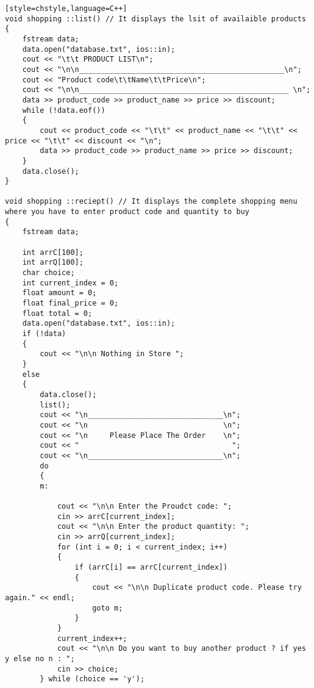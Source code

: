 \documentclass{article}
\begin{document}
\begin{verbatim}[style=chstyle,language=C++]
void shopping ::list() // It displays the lsit of availaible products
{
    fstream data;
    data.open("database.txt", ios::in);
    cout << "\t\t PRODUCT LIST\n";
    cout << "\n\n_______________________________________________\n";
    cout << "Product code\t\tName\t\tPrice\n";
    cout << "\n\n________________________________________________ \n";
    data >> product_code >> product_name >> price >> discount;
    while (!data.eof())
    {
        cout << product_code << "\t\t" << product_name << "\t\t" << price << "\t\t" << discount << "\n";
        data >> product_code >> product_name >> price >> discount;
    }
    data.close();
}

void shopping ::reciept() // It displays the complete shopping menu where you have to enter product code and quantity to buy
{
    fstream data;

    int arrC[100];
    int arrQ[100];
    char choice;
    int current_index = 0;
    float amount = 0;
    float final_price = 0;
    float total = 0;
    data.open("database.txt", ios::in);
    if (!data)
    {
        cout << "\n\n Nothing in Store ";
    }
    else
    {
        data.close();
        list();
        cout << "\n_______________________________\n";
        cout << "\n                               \n";
        cout << "\n     Please Place The Order    \n";
        cout << "                                   ";
        cout << "\n_______________________________\n";
        do
        {
        m:

            cout << "\n\n Enter the Proudct code: ";
            cin >> arrC[current_index];
            cout << "\n\n Enter the product quantity: ";
            cin >> arrQ[current_index];
            for (int i = 0; i < current_index; i++)
            {
                if (arrC[i] == arrC[current_index])
                {
                    cout << "\n\n Duplicate product code. Please try again." << endl;
                    goto m;
                }
            }
            current_index++;
            cout << "\n\n Do you want to buy another product ? if yes y else no n : ";
            cin >> choice;
        } while (choice == 'y');


\end{verbatim}
\end{document}

